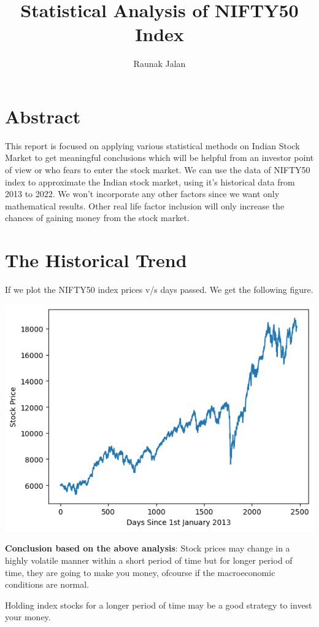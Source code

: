 \documentclass[11pt]{article}
\begin{document}
\author{Raunak Jalan}
\title{Statistical Analysis of NIFTY50 Index}
\maketitle

\section*{Abstract}

This report is focused on applying various statistical methods on Indian Stock Market to get meaningful conclusions which will be helpful from an investor point of view or who fears to enter the stock market. We can use the data of NIFTY50 index to approximate the Indian stock market, using it's historical data from 2013 to 2022. We won't incorporate any other factors since we want only mathematical results. Other real life factor inclusion will only increase the chances of gaining money from the stock market.

\section*{The Historical Trend}

If we plot the NIFTY50 index prices v/s days passed. We get the following figure.

\begin{center}
 \includegraphics[scale=1.05]{prices.png}
\end{center}

\begin{flushleft}
\textbf{Conclusion based on the above analysis}: Stock prices may change in a highly volatile manner within a short period of time but for longer period of time, they are going to make you money, ofcourse if the macroeconomic conditions are normal.
\end{flushleft}
Holding index stocks for a longer period of time may be a good strategy to invest your money.
\newpage
\end{document}

